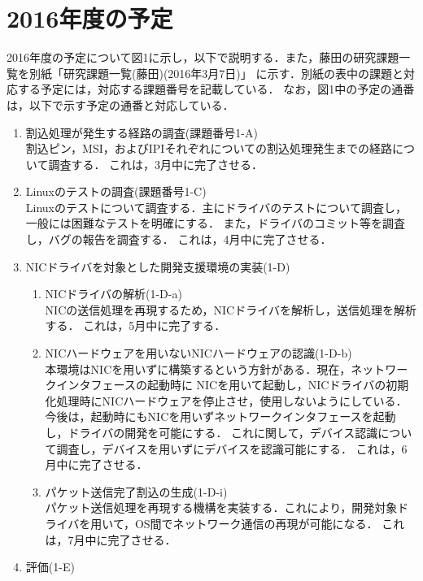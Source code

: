 \documentclass[12pt]{jsarticle}
\begin{document}
\section{2016年度の予定}
2016年度の予定について図1に示し，以下で説明する．また，藤田の研究課題一覧を別紙「研究課題一覧(藤田)(2016年3月7日)」
に示す．別紙の表中の課題と対応する予定には，対応する課題番号を記載している．
なお，図1中の予定の通番は，以下で示す予定の通番と対応している．
\begin{enumerate}
    \item 割込処理が発生する経路の調査(課題番号1-A)\\
        割込ピン，MSI，およびIPIそれぞれについての割込処理発生までの経路について調査する．
        これは，3月中に完了させる．
    \item Linuxのテストの調査(課題番号1-C)\\
        Linuxのテストについて調査する．主にドライバのテストについて調査し，一般には困難なテストを明確にする．
        また，ドライバのコミット等を調査し，バグの報告を調査する．
        これは，4月中に完了させる．
    \item NICドライバを対象とした開発支援環境の実装(1-D)
        \begin{enumerate}
            \item NICドライバの解析(1-D-a)\\
                NICの送信処理を再現するため，NICドライバを解析し，送信処理を解析する．
                これは，5月中に完了する．
            \item NICハードウェアを用いないNICハードウェアの認識(1-D-b)\\
                本環境はNICを用いずに構築するという方針がある．現在，ネットワークインタフェースの起動時に
                NICを用いて起動し，NICドライバの初期化処理時にNICハードウェアを停止させ，使用しないようにしている．
                今後は，起動時にもNICを用いずネットワークインタフェースを起動し，ドライバの開発を可能にする．
                これに関して，デバイス認識について調査し，デバイスを用いずにデバイスを認識可能にする．
                これは，6月中に完了させる．
            \item パケット送信完了割込の生成(1-D-i)\\
                パケット送信処理を再現する機構を実装する．これにより，開発対象ドライバを用いて，OS間でネットワーク通信の再現が可能になる．
                これは，7月中に完了させる．
        \end{enumerate}
    \item 評価(1-E)

\end{enumerate}
\end{document}
